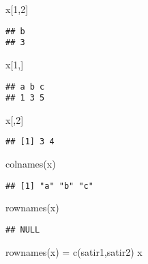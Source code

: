 \documentclass[
]{book}
\newenvironment{Shaded}{\begin{snugshade}}{\end{snugshade}}
\newcommand{\DecValTok}[1]{\textcolor[rgb]{0.00,0.00,0.81}{#1}}
\newcommand{\FunctionTok}[1]{\textcolor[rgb]{0.00,0.00,0.00}{#1}}
\newcommand{\NormalTok}[1]{#1}
\newcommand{\OtherTok}[1]{\textcolor[rgb]{0.56,0.35,0.01}{#1}}
\newcommand{\StringTok}[1]{\textcolor[rgb]{0.31,0.60,0.02}{#1}}
\begin{document}
\begin{Shaded}
\begin{Highlighting}[]
\NormalTok{x[}\DecValTok{1}\NormalTok{,}\DecValTok{2}\NormalTok{]}
\end{Highlighting}
\end{Shaded}

\begin{verbatim}
## b 
## 3
\end{verbatim}

\begin{Shaded}
\begin{Highlighting}[]
\NormalTok{x[}\DecValTok{1}\NormalTok{,]}
\end{Highlighting}
\end{Shaded}

\begin{verbatim}
## a b c 
## 1 3 5
\end{verbatim}

\begin{Shaded}
\begin{Highlighting}[]
\NormalTok{x[,}\DecValTok{2}\NormalTok{]}
\end{Highlighting}
\end{Shaded}

\begin{verbatim}
## [1] 3 4
\end{verbatim}

\begin{Shaded}
\begin{Highlighting}[]
\FunctionTok{colnames}\NormalTok{(x)}
\end{Highlighting}
\end{Shaded}

\begin{verbatim}
## [1] "a" "b" "c"
\end{verbatim}

\begin{Shaded}
\begin{Highlighting}[]
\FunctionTok{rownames}\NormalTok{(x)}
\end{Highlighting}
\end{Shaded}

\begin{verbatim}
## NULL
\end{verbatim}

\begin{Shaded}
\begin{Highlighting}[]
\FunctionTok{rownames}\NormalTok{(x) }\OtherTok{=} \FunctionTok{c}\NormalTok{(}\StringTok{\textquotesingle{}satir1\textquotesingle{}}\NormalTok{,}\StringTok{\textquotesingle{}satir2\textquotesingle{}}\NormalTok{)}
\NormalTok{x}
\end{Highlighting}
\end{Shaded}
\end{document}
